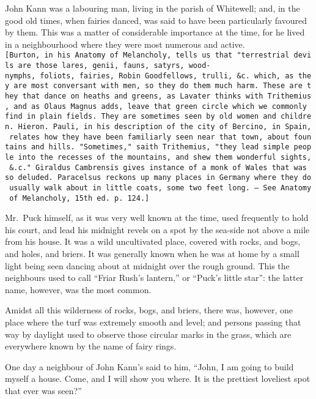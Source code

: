 \documentclass[
  12pt,
  a5paper,
  twoside]{book}
\let\oldtexttt\texttt        %
\renewcommand{\texttt}[1]{\footnotesize\oldtexttt{#1}}
\begin{document}
John Kann was a labouring man, living in the parish of Whitewell; and,
in the good old times, when fairies danced, was said to have been
particularly favoured by them. This was a matter of considerable
importance at the time, for he lived in a neighbourhood where they were
most numerous and active.
\texttt{{[}Burton,\ in\ his\ Anatomy\ of\ Melancholy,\ tells\ us\ that\ "terrestrial\ devils\ are\ those\ lares,\ genii,\ fauns,\ satyrs,\ wood-nymphs,\ foliots,\ fairies,\ Robin\ Goodfellows,\ trulli,\ \&c.\ which,\ as\ they\ are\ most\ conversant\ with\ men,\ so\ they\ do\ them\ much\ harm.\ These\ are\ they\ that\ dance\ on\ heaths\ and\ greens,\ as\ Lavater\ thinks\ with\ Trithemius,\ and\ as\ Olaus\ Magnus\ adds,\ leave\ that\ green\ circle\ which\ we\ commonly\ find\ in\ plain\ fields.\ They\ are\ sometimes\ seen\ by\ old\ women\ and\ children.\ Hieron.\ Pauli,\ in\ his\ description\ of\ the\ city\ of\ Bercino,\ in\ Spain,\ relates\ how\ they\ have\ been\ familiarly\ seen\ near\ that\ town,\ about\ fountains\ and\ hills.\ "Sometimes,"\ saith\ Trithemius,\ "they\ lead\ simple\ people\ into\ the\ recesses\ of\ the\ mountains,\ and\ shew\ them\ wonderful\ sights,\ \&.c."\ Giraldus\ Cambrensis\ gives\ instance\ of\ a\ monk\ of\ Wales\ that\ was\ so\ deluded.\ Paracelsus\ reckons\ up\ many\ places\ in\ Germany\ where\ they\ do\ usually\ walk\ about\ in\ little\ coats,\ some\ two\ feet\ long.\ —\ See\ Anatomy\ of\ Melancholy,\ 15th\ ed.\ p.\ 124.{]}}

Mr.~Puck himself, as it was very well known at the time, used frequently
to hold his court, and lead his midnight revels on a spot by the
sea-side not above a mile from his house. It was a wild uncultivated
place, covered with rocks, and bogs, and holes, and briers. It was
generally known when he was at home by a small light being seen dancing
about at midnight over the rough ground. This the neighbours used to
call ``Friar Rush's lantern,'' or ``Puck's little star'': the latter
name, however, was the most common.

Amidst all this wilderness of rocks, bogs, and briers, there was,
however, one place where the turf was extremely smooth and level; and
persons passing that way by daylight used to observe those circular
marks in the grass, which are everywhere known by the name of fairy
rings.

One day a neighbour of John Kann's said to him, ``John, I am going to
build myself a house. Come, and I will show you where. It is the
prettiest loveliest spot that ever was seen?''
\end{document}
